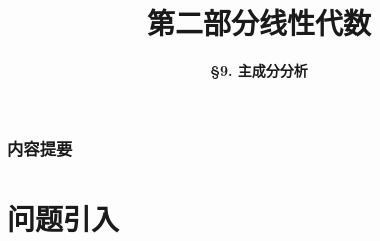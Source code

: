 


\usepackage{arydshln}


\title[Linear Algebra]{\LARGE \bfseries 第二部分\quad 线性代数} %
\author[PCA] %
{\Large \bfseries \S 9. 主成分分析}
\date{}






\begin{frame}

\titlepage %

\end{frame}


\begin{frame}
\frametitle{内容提要} %
\tableofcontents %
\end{frame}



\section{问题引入}

